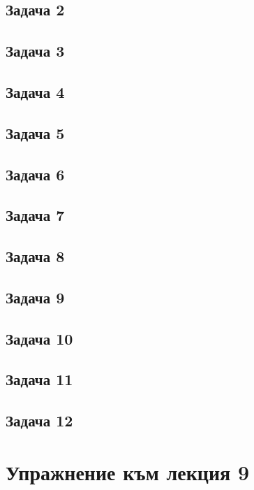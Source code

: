 \documentclass[a4paper,fleqn,12pt]{article}
\theoremstyle{definition}
\begin{document}
\subsection*{Задача 2}

\subsection*{Задача 3}

\subsection*{Задача 4}

\subsection*{Задача 5}

\subsection*{Задача 6}

\subsection*{Задача 7}

\subsection*{Задача 8}

\subsection*{Задача 9}

\subsection*{Задача 10}

\subsection*{Задача 11}

\subsection*{Задача 12}

\newpage 
\section{Упражнение към лекция 9}
\end{document}
